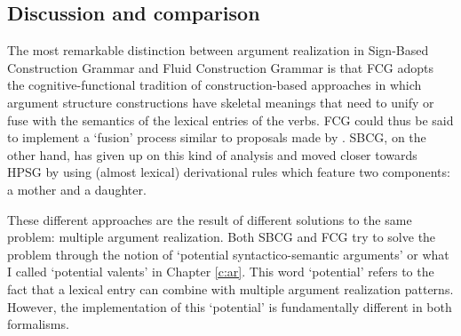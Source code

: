 \subsection{Discussion and comparison}
\label{s:active-passive}

 The most remarkable distinction between argument realization in Sign-Based Construction Grammar and Fluid Construction Grammar is that FCG adopts the cognitive-functional tradition of construction-based approaches in which argument structure constructions have skeletal meanings that need to unify or fuse with the semantics of the lexical entries of the verbs. FCG could thus be said to implement a `fusion' process similar to proposals made by \citet{goldberg95construction}. SBCG, on the other hand, has given up on this kind of analysis and moved closer towards HPSG by using (almost lexical) derivational rules which feature two components: a mother and a daughter.

These different approaches are the result of different solutions to the same problem: multiple argument realization. Both SBCG and FCG try to solve the problem through the notion of `potential syntactico-semantic arguments' \citep{sag07sbcg} or what I called `potential valents' in Chapter \ref{c:ar}. This word `potential' refers to the fact that a lexical entry can combine with multiple argument realization patterns. However, the implementation of this `potential' is fundamentally different in both formalisms.

